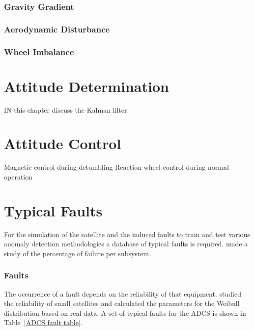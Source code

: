 \subsubsection{Gravity Gradient}

\subsubsection{Aerodynamic Disturbance}

\subsubsection{Wheel Imbalance}

\section{Attitude Determination}
IN this chapter discuss the Kalman filter.

\section{Attitude Control}
Magnetic control during detumbling
Reaction wheel control during normal operation

\section{Typical Faults}
For the simulation of the satellite and the induced faults to train and test various anomaly detection methodologies a database of typical faults is required. \textcite{tafazoli2009study} made a study of the percentage of failure per subsystem. 

\subsubsection{Faults}
The occurrence of a fault depends on the reliability of that equipment. \textcite{Guo2014} studied the reliability of small satellites and calculated the parameters for the Weibull distribution based on real data. A set of typical faults for the ADCS is shown in Table~\ref{ADCS fault table}. 

